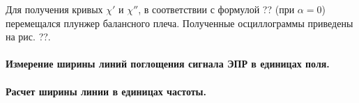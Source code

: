 Для получения кривых $\chi'$ и $\chi''$, в соответствии с формулой ?? (при $\alpha = 0$) перемещался плунжер балансного плеча. Полученные осциллограммы
приведены на рис. ??.



\paragraph{Измерение ширины линий поглощения сигнала ЭПР в единицах поля.}%


\paragraph{Расчет ширины линии в единицах частоты.}

